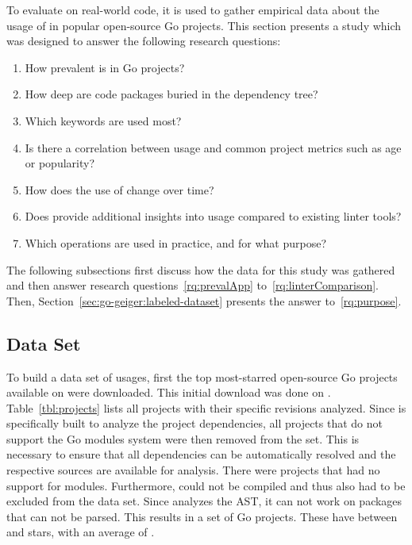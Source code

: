 To evaluate \toolGeiger{} on real-world code, it is used to gather empirical data about the usage of \unsafe{} in
popular open-source Go projects.
This section presents a study which was designed to answer the following research questions:

\begin{enumerate}[left=0.5cm, label={RQ\arabic*}]
    \item How prevalent is \unsafe{} in Go projects? \label{rq:prevalApp}
    \item How deep are \unsafe{} code packages buried in the dependency tree? \label{rq:depsDepth}
    \item Which \unsafe{} keywords are used most? \label{rq:distTypes}
    \item Is there a correlation between \unsafe{} usage and common project metrics such as age or popularity? \label{rq:popularity}
    \item How does the use of \unsafe{} change over time? \label{rq:changeTime}
    \item Does \toolGeiger{} provide additional insights into \unsafe{} usage compared to existing linter tools? \label{rq:linterComparison}
    \item Which \unsafe{} operations are used in practice, and for what purpose? \label{rq:purpose}
\end{enumerate}

The following subsections first discuss how the data for this study was gathered and then answer research
questions~\ref{rq:prevalApp} to~\ref{rq:linterComparison}.
Then, Section~\ref{sec:go-geiger:labeled-dataset} presents the answer to~\ref{rq:purpose}.



\subsection{Data Set}\label{subsec:go-geiger:evaluation:data-set}

To build a data set of \unsafe{} usages, first the top \projsTotal{} most-starred open-source Go projects available on
\github{} were downloaded.
This initial download was done on .
Table~\ref{tbl:projects} lists all projects with their specific revisions analyzed.
Since \toolGeiger{} is specifically built to analyze the project dependencies, all projects that do not support the Go
modules system were then removed from the set.
This is necessary to ensure that all dependencies can be automatically resolved and the respective sources are available
for analysis.
There were \projsWithoutModules{} projects that had no support for modules.
Furthermore, \projsNotCompiled{} could not be compiled and thus also had to be excluded from the data set.
Since \toolGeiger{} analyzes the \acrshort{AST}, it can not work on packages that can not be parsed.
This results in a set of \projsAnalyzed{} Go projects.
These have between  and  stars, with an average of .

